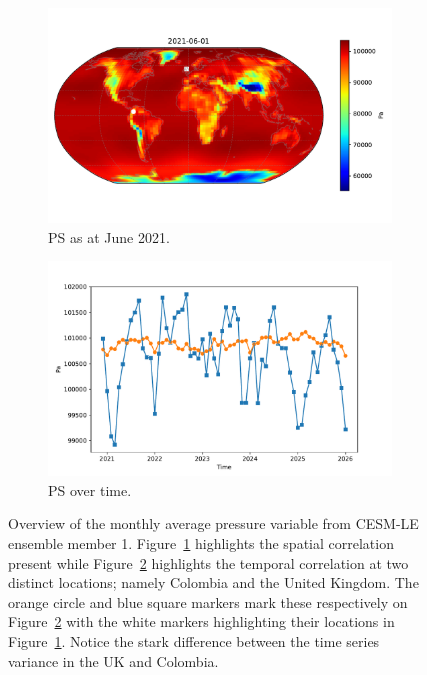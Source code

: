 \begin{figure}[htbp!] 
	\centering
	\begin{subfigure}[b]{0.45\textwidth}
		\includegraphics[width=\textwidth]{PS_example}
		\caption{PS as at June 2021.}
		\label{fig:pressure_june}   
	\end{subfigure}             
	\begin{subfigure}[b]{0.45\textwidth}
		\includegraphics[width=\textwidth]{PS_example_temp}
		\caption{PS  over time.}
		\label{fig:pressure_temp}
	\end{subfigure}             
	\caption[Overview of Pressure variable]{Overview of the monthly average pressure variable from CESM-LE ensemble member 1. Figure~\ref{fig:pressure_june} highlights the spatial correlation present while Figure~\ref{fig:pressure_temp} highlights the temporal correlation at two distinct locations; namely Colombia and the United Kingdom. The orange circle and blue square markers mark these respectively on Figure~\ref{fig:pressure_temp} with the white markers highlighting their locations in Figure~\ref{fig:pressure_june}. Notice the stark difference between the time series variance in the UK and Colombia.}
	\label{fig:pressure_overview}
\end{figure}

